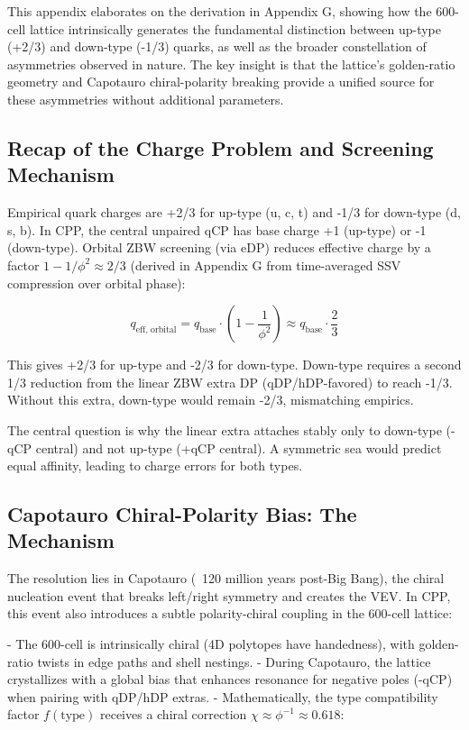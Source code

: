 \documentclass{article}
\begin{document}
This appendix elaborates on the derivation in Appendix G, showing how the 600-cell lattice intrinsically generates the fundamental distinction between up-type (+2/3) and down-type (-1/3) quarks, as well as the broader constellation of asymmetries observed in nature. The key insight is that the lattice's golden-ratio geometry and Capotauro chiral-polarity breaking provide a unified source for these asymmetries without additional parameters.

\subsection{Recap of the Charge Problem and Screening Mechanism}

Empirical quark charges are +2/3 for up-type (u, c, t) and -1/3 for down-type (d, s, b). In CPP, the central unpaired qCP has base charge +1 (up-type) or -1 (down-type). Orbital ZBW screening (via eDP) reduces effective charge by a factor $1 - 1/\phi^2 \approx 2/3$ (derived in Appendix G from time-averaged SSV compression over orbital phase):

\begin{equation}
q_{\text{eff, orbital}} = q_{\text{base}} \cdot \left(1 - \frac{1}{\phi^2}\right) \approx q_{\text{base}} \cdot \frac{2}{3}
\end{equation}

This gives +2/3 for up-type and -2/3 for down-type. Down-type requires a second 1/3 reduction from the linear ZBW extra DP (qDP/hDP-favored) to reach -1/3. Without this extra, down-type would remain -2/3, mismatching empirics.

The central question is why the linear extra attaches stably only to down-type (-qCP central) and not up-type (+qCP central). A symmetric sea would predict equal affinity, leading to charge errors for both types.

\subsection{Capotauro Chiral-Polarity Bias: The Mechanism}

The resolution lies in Capotauro (~120 million years post-Big Bang), the chiral nucleation event that breaks left/right symmetry and creates the VEV. In CPP, this event also introduces a subtle polarity-chiral coupling in the 600-cell lattice:

- The 600-cell is intrinsically chiral (4D polytopes have handedness), with golden-ratio twists in edge paths and shell nestings.
- During Capotauro, the lattice crystallizes with a global bias that enhances resonance for negative poles (-qCP) when pairing with qDP/hDP extras.
- Mathematically, the type compatibility factor $f(\text{type})$ receives a chiral correction $\chi \approx \phi^{-1} \approx 0.618$:
\end{document}
